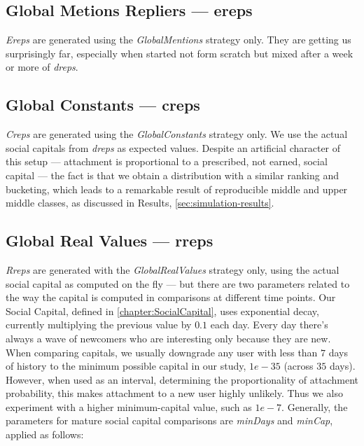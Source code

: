 \documentclass[10pt,oneside]{memoir}
\begin{document}
\subsection{Global Metions Repliers --- ereps}
\label{globalmetionsrepliersereps}

{\itshape Ereps} are generated using the {\itshape GlobalMentions} strategy only.  They are getting us surprisingly far, especially when started not form scratch but mixed after a week or more of {\itshape dreps}.


\subsection{Global Constants --- creps}
\label{globalconstantscreps}

{\itshape Creps} are generated using the {\itshape GlobalConstants} strategy only.  We use the actual social capitals from {\itshape dreps} as expected values.  Despite an artificial character of this setup --- attachment is proportional to a prescribed, not earned, social capital --- the fact is that we obtain a distribution with a similar ranking and bucketing, which leads to a remarkable result of reproducible middle and upper middle classes, as discussed in Results, \ref{sec:simulation-results}.


\subsection{Global Real Values --- rreps}
\label{globalrealvaluesrreps}

{\itshape Rreps} are generated with the {\itshape GlobalRealValues} strategy only, using the actual social capital as computed on the fly --- but there are two parameters related to the way the capital is computed in comparisons at different time points.  Our Social Capital, defined in \ref{chapter:SocialCapital}, uses exponential decay, currently multiplying the previous value by $0.1$ each day.  Every day there's always a wave of newcomers who are interesting only because they are new.  When comparing capitals, we usually downgrade any user with less than $7$ days of history to the minimum possible capital in our study, $1e-35$ (across $35$ days).  However, when used as an interval, determining the proportionality of attachment probability, this makes attachment to a new user highly unlikely.  Thus we also experiment with a higher minimum-capital value, such as $1e-7$.  Generally, the parameters for mature social capital comparisons are {\itshape minDays} and {\itshape minCap}, applied as follows:
\end{document}
